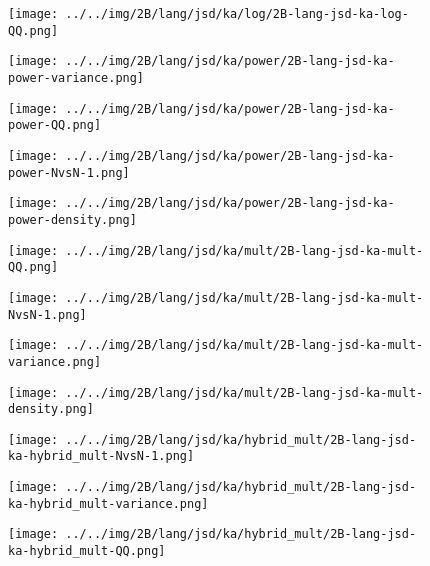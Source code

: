 \begin{figure}[H]
\centering	\texttt{[image: ../../img/2B/lang/jsd/ka/log/2B-lang-jsd-ka-log-QQ.png]}
\end{figure}
\begin{figure}[H]
\centering	\texttt{[image: ../../img/2B/lang/jsd/ka/power/2B-lang-jsd-ka-power-variance.png]}
\end{figure}
\begin{figure}[H]
\centering	\texttt{[image: ../../img/2B/lang/jsd/ka/power/2B-lang-jsd-ka-power-QQ.png]}
\end{figure}
\begin{figure}[H]
\centering	\texttt{[image: ../../img/2B/lang/jsd/ka/power/2B-lang-jsd-ka-power-NvsN-1.png]}
\end{figure}
\begin{figure}[H]
\centering	\texttt{[image: ../../img/2B/lang/jsd/ka/power/2B-lang-jsd-ka-power-density.png]}
\end{figure}
\begin{figure}[H]
\centering	\texttt{[image: ../../img/2B/lang/jsd/ka/mult/2B-lang-jsd-ka-mult-QQ.png]}
\end{figure}
\begin{figure}[H]
\centering	\texttt{[image: ../../img/2B/lang/jsd/ka/mult/2B-lang-jsd-ka-mult-NvsN-1.png]}
\end{figure}
\begin{figure}[H]
\centering	\texttt{[image: ../../img/2B/lang/jsd/ka/mult/2B-lang-jsd-ka-mult-variance.png]}
\end{figure}
\begin{figure}[H]
\centering	\texttt{[image: ../../img/2B/lang/jsd/ka/mult/2B-lang-jsd-ka-mult-density.png]}
\end{figure}
\begin{figure}[H]
\centering	\texttt{[image: ../../img/2B/lang/jsd/ka/hybrid\_mult/2B-lang-jsd-ka-hybrid\_mult-NvsN-1.png]}
\end{figure}
\begin{figure}[H]
\centering	\texttt{[image: ../../img/2B/lang/jsd/ka/hybrid\_mult/2B-lang-jsd-ka-hybrid\_mult-variance.png]}
\end{figure}
\begin{figure}[H]
\centering	\texttt{[image: ../../img/2B/lang/jsd/ka/hybrid\_mult/2B-lang-jsd-ka-hybrid\_mult-QQ.png]}
\end{figure}
